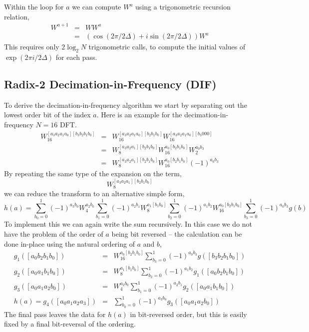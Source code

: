 \documentclass[fleqn,12pt]{article}
\begin{document}
Within the loop for $a$ we can compute $W^a$  using a trigonometric
recursion relation,
%
\begin{eqnarray}
W^{a+1} &=& W W^a \\
        &=& (\cos(2\pi/2\Delta) + i \sin(2\pi/2\Delta)) W^a
\end{eqnarray}
%
This requires only $2 \log_2 N$ trigonometric calls, to compute the
initial values of $\exp(2\pi i /2\Delta)$ for each pass.

\subsection{Radix-2 Decimation-in-Frequency (DIF)}
%
To derive the decimation-in-frequency algorithm we start by separating
out the lowest order bit of the index $a$. Here is an example for the
decimation-in-frequency $N=16$ DFT.
%
\begin{eqnarray}
W_{16}^{[a_3 a_2 a_1 a_0][b_3 b_2 b_1 b_0]} 
&=&
W_{16}^{[a_3 a_2 a_1 a_0][b_2 b_1 b_0]} W_{16}^{[a_3 a_2 a_1 a_0] [b_3
0 0 0]} \\
&=&
W_8^{[a_3 a_2 a_1][b_2 b_1 b_0]} W_{16}^{a_0 [b_2 b_1 b_0]} W_2^{a_0
b_3} \\
&=&
W_8^{[a_3 a_2 a_1][b_2 b_1 b_0]} W_{16}^{a_0 [b_2 b_1 b_0]} (-1)^{a_0 b_3}
\end{eqnarray}
%
By repeating the same type of the expansion on the term,
%
\begin{equation}
W_8^{[a_3 a_2 a_1][b_2 b_1 b_0]}
\end{equation}
%
we can reduce the transform to an alternative simple form,
%
\begin{equation}
h(a) = 
\sum_{b_0=0}^1 (-1)^{a_3 b_0} W_4^{a_2 b_0}
\sum_{b_1=0}^1 (-1)^{a_2 b_1} W_8^{a_1 [b_1 b_0]}
\sum_{b_2=0}^1 (-1)^{a_1 b_2} W_{16}^{a_0 [b_2 b_1 b_0]}
\sum_{b_3=0}^1 (-1)^{a_0 b_3} g(b)
\end{equation}
%
To implement this we can again write the sum recursively. In this case
we do not have the problem of the order of $a$ being bit reversed --
the calculation can be done in-place using the natural ordering of
$a$ and $b$,
%
\begin{eqnarray}
g_1([a_0 b_2 b_1 b_0]) 
&=&
W_{16}^{a_0 [b_2 b_1 b_0]} 
\sum_{b_3=0}^1 (-1)^{a_0 b_3} g([b_3 b_2 b_1 b_0]) \\
g_2([a_0 a_1 b_1 b_0]) 
&=&
W_{8}^{a_1 [b_1 b_0]} 
\sum_{b_2=0}^1 (-1)^{a_1 b_2} g_1([a_0 b_2 b_1 b_0]) \\
g_3([a_0 a_1 a_2 b_0]) 
&=&
W_{4}^{a_2 b_0} 
\sum_{b_1=0}^1 (-1)^{a_2 b_1} g_2([a_0 a_1 b_1 b_0]) \\
h(a)
= 
g_4([a_0 a_1 a_2 a_3]) 
&=&
\sum_{b_0=0}^1 (-1)^{a_3 b_0} g_3([a_0 a_1 a_2 b_0])
\end{eqnarray}
%
The final pass leaves the data for $h(a)$ in bit-reversed order, but
this is easily fixed by a final bit-reversal of the ordering.
\end{document}
